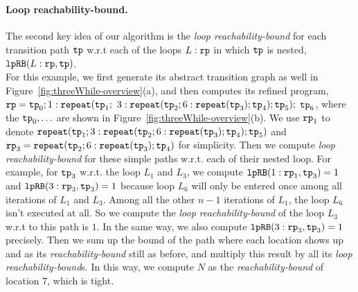 \\
\paragraph*{Loop reachability-bound.}
The second key idea of our algorithm is the
\emph{loop reachability-bound} for each transition path $\mathtt{tp}$ w.r.t each of the loops $L:\mathtt{rp}$ in which $\mathtt{tp}$ is nested,
$\mathtt{lpRB}(L:\mathtt{rp}, \mathtt{tp})$.
\\
For this example, we first generate its abstract transition graph as well in Figure~\ref{fig:threeWhile-overview}(a),
and then computes its refined program,
$\mathtt{rp} = \mathtt{tp}_0; 1: \mathtt{repeat}(\mathtt{tp}_1;$ 
$3: {\mathtt{repeat}(\mathtt{tp}_2; 6 : {\mathtt{repeat}(\mathtt{tp}_3)}; \mathtt{tp}_4)}; \mathtt{tp}_5);$ 
$\mathtt{tp}_6$,
where the $\mathtt{tp}_0, \ldots$ are shown in Figure~\ref{fig:threeWhile-overview}(b).
We use $\mathtt{rp}_1$ to denote ${\mathtt{repeat}(\mathtt{tp}_1; 3: {\mathtt{repeat}(\mathtt{tp}_2; 6 : {\mathtt{repeat}(\mathtt{tp}_3)}; \mathtt{tp}_4)}; \mathtt{tp}_5)}$
and $\mathtt{rp}_3 = {\mathtt{repeat}(\mathtt{tp}_2; 6 : {\mathtt{repeat}(\mathtt{tp}_3)}; \mathtt{tp}_4)}$
for simplicity.
Then we compute \emph{loop reachability-bound} for these simple paths w.r.t. each of their nested loop.
For example, for $\mathtt{tp}_3$ w.r.t. the loop $L_1$ and $L_3$, we compute
$\mathtt{lpRB}(1: \mathtt{rp}_1, \mathtt{tp}_3) = 1$ and
$\mathtt{lpRB}(3: \mathtt{rp}_3, \mathtt{tp}_3) = 1$ because loop $L_6$ will only be entered once among all iterations of $L_1$ and $L_3$.
Among all the other $n - 1$ iterations of $L_1$, the loop $L_6$ isn't executed at all.
So we compute the \emph{loop reachability-bound}  of the loop $L_3$
w.r.t to this path is $1$.
In the same way, we also compute $\mathtt{lpRB}(3: \mathtt{rp}_3, \mathtt{tp}_3) = 1$ precisely.
Then we sum up the bound of the path where each location shows up
and as its \emph{reachability-bound} still as before,
and multiply this result by all its \emph{loop reachability-bound}s.
In this way, we compute $N$ as the \emph{reachability-bound} of location $7$, which is tight.

